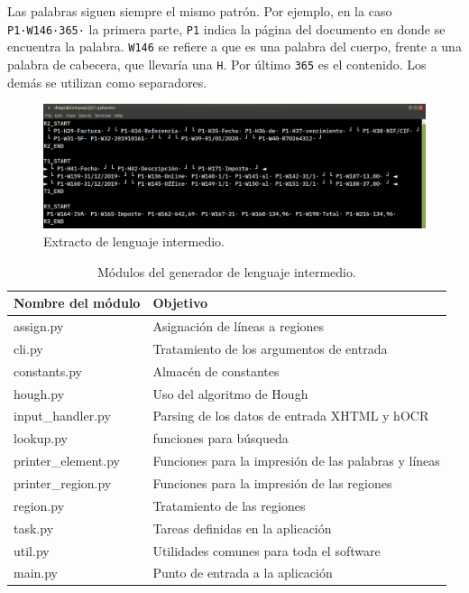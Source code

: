 Las palabras siguen siempre el mismo patrón. Por ejemplo, en la caso \verb|P1·W146·365·| la primera parte, \verb|P1| indica la página del documento en donde se encuentra la palabra. \verb|W146| se refiere a que es una palabra del cuerpo, frente a una palabra de cabecera, que llevaría una \verb|H|. Por último \verb|365| es el contenido. Los demás se utilizan como separadores.

\begin{figure}[hp!]
    \centering
    \includegraphics[width=1.0\textwidth]{imaxes/h-implementacion/lenguaje-intermedio.png}
    \caption{Extracto de lenguaje intermedio.}
    \label{fig:lenguaje-intermedio}
\end{figure}

\begin{table}[ht]
    \centering
    \begin{tabular}{l l}
        Nombre del módulo & Objetivo \\
        \hline
        \hline
        assign.py & Asignación de líneas a regiones \\
        cli.py & Tratamiento de los argumentos de entrada \\
        constants.py & Almacén de constantes \\
        hough.py & Uso del algoritmo de Hough \\
        input\_handler.py & Parsing de los datos de entrada XHTML y hOCR \\
        lookup.py & funciones para búsqueda \\
        printer\_element.py & Funciones para la impresión de las palabras y líneas \\
        printer\_region.py & Funciones para la impresión de las regiones \\
        region.py & Tratamiento de las regiones \\
        task.py & Tareas definidas en la aplicación \\
        util.py & Utilidades comunes para toda el software \\
        main.py & Punto de entrada a la aplicación \\
    \end{tabular}
    \caption{Módulos del generador de lenguaje intermedio.}    
    \label{tab:modulo-generador-codigo-intermedio}
\end{table}

